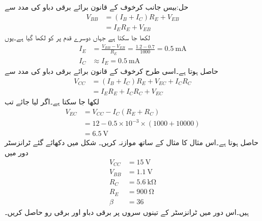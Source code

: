 حل:بیس جانب کرخوف کے قانون برائے برقی دباو کی مدد سے 
\begin{align*}
V_{BB}&=\left(I_B+I_C \right) R_E+V_{EB}\\
&=I_E R_E +V_{EB}
\end{align*}
لکھا جا سکتا ہے جہاں دوسرے قدم پر  کو  لکھا گیا ہے۔یوں
\begin{align*}
I_E&=\frac{V_{BB}-V_{EB}}{R_E}=\frac{1.2-0.7}{1000}=\SI{0.5}{\milli \ampere}\\
I_C &\approx I_E =\SI{0.5}{\milli \ampere} 
\end{align*}
حاصل ہوتا ہے۔اسی طرح کرخوف کے قانون برائے برقی دباو کی مدد سے
\begin{align*}
V_{CC}&=\left(I_B+I_C \right)R_E+V_{EC}+I_C R_C\\
&=I_E  R_E + I_C R_C +V_{EC}
\end{align*}
لکھا جا سکتا ہے۔اگر  لیا جائے تب
\begin{align*}
V_{EC}&=V_{CC}-I_C \left(R_E+R_C \right)\\
&=12-0.5 \times 10^{-3} \times \left (1000+10000 \right)\\
&=\SI{6.5}{\volt}
\end{align*}
حاصل ہوتا ہے۔اس مثال کا مثال  کے ساتھ موازنہ کریں۔ 
شکل    میں دکھائے گئے ٹرانزسٹر دور میں
\begin{align*}
V_{CC} &=\SI{15}{\volt}\\
V_{BB} &=\SI{1.1}{\volt}\\
R_C&=\SI{5.6}{\kilo \ohm} \\
R_E &=\SI{900}{\ohm} \\
\beta &=36
\end{align*}
 ہیں۔اس دور میں ٹرانزسٹر کے تینوں سروں پر برقی دباو اور برقی رو حاصل کریں۔

